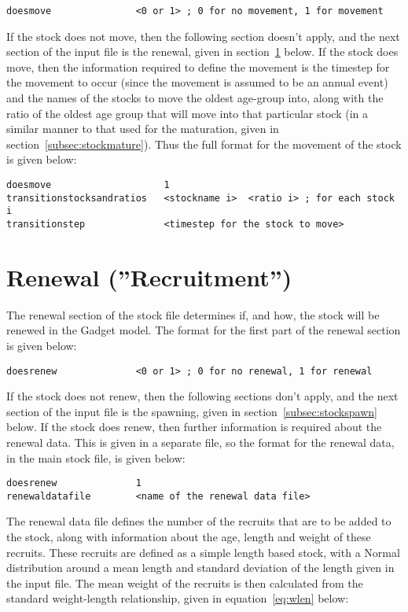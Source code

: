 \documentclass [a4paper, 10pt]{book}
\begin{document}
{\small\begin{verbatim}
doesmove               <0 or 1> ; 0 for no movement, 1 for movement
\end{verbatim}}

If the stock does not move, then the following section doesn't apply, and the next section of the input file is the renewal, given in section~\ref{subsec:stockrenew} below.  If the stock does move, then the information required to define the movement is the timestep for the movement to occur (since the movement is assumed to be an annual event) and the names of the stocks to move the oldest age-group into, along with the ratio of the oldest age group that will move into that particular stock (in a similar manner to that used for the maturation, given in section~\ref{subsec:stockmature}).  Thus the full format for the movement of the stock is given below:

{\small\begin{verbatim}
doesmove                    1
transitionstocksandratios   <stockname i>  <ratio i> ; for each stock i
transitionstep              <timestep for the stock to move>
\end{verbatim}}

\section{Renewal (''Recruitment'')}\label{subsec:stockrenew}
The renewal section of the stock file determines if, and how, the stock will be renewed in the Gadget model. The format for the first part of the renewal section is given below:

{\small\begin{verbatim}
doesrenew              <0 or 1> ; 0 for no renewal, 1 for renewal
\end{verbatim}}

If the stock does not renew, then the following sections don't apply, and the next section of the input file is the spawning, given in section~\ref{subsec:stockspawn} below.  If the stock does renew, then further information is required about the renewal data.  This is given in a separate file, so the format for the renewal data, in the main stock file, is given below:

{\small\begin{verbatim}
doesrenew              1
renewaldatafile        <name of the renewal data file>
\end{verbatim}}

The renewal data file defines the number of the recruits that are to be added to the stock, along with information about the age, length and weight of these recruits.  These recruits are defined as a simple length based stock, with a Normal distribution around a mean length and standard deviation of the length given in the input file.  The mean weight of the recruits is then calculated from the standard weight-length relationship, given in equation~\ref{eq:wlen} below:
\end{document}
